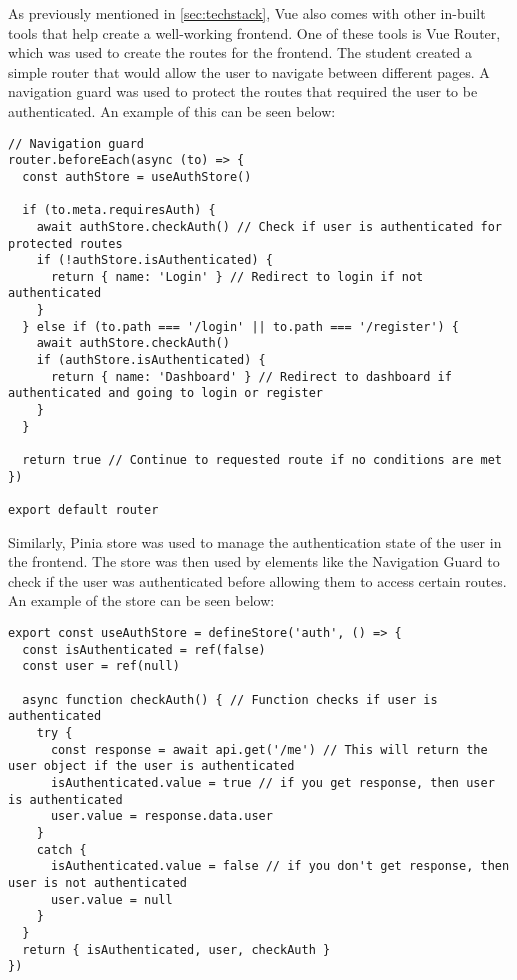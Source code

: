 
As previously mentioned in \ref{sec:techstack}, Vue also comes with other in-built tools that help create a well-working frontend. One of these tools is Vue Router, which was used to create the routes for the frontend. The student created a simple router that would allow the user to navigate between different pages. A navigation guard was used to protect the routes that required the user to be authenticated. An example of this can be seen below:

\begin{lstlisting}[caption=Vue Router Navigation Guard]
    // Navigation guard
router.beforeEach(async (to) => {
  const authStore = useAuthStore()

  if (to.meta.requiresAuth) {
    await authStore.checkAuth() // Check if user is authenticated for protected routes
    if (!authStore.isAuthenticated) {
      return { name: 'Login' } // Redirect to login if not authenticated
    }
  } else if (to.path === '/login' || to.path === '/register') {
    await authStore.checkAuth()
    if (authStore.isAuthenticated) {
      return { name: 'Dashboard' } // Redirect to dashboard if authenticated and going to login or register
    }
  }

  return true // Continue to requested route if no conditions are met
})

export default router
\end{lstlisting}

Similarly, Pinia store was used to manage the authentication state of the user in the frontend. The store was then used by elements like the Navigation Guard to check if the user was authenticated before allowing them to access certain routes. An example of the store can be seen below:

\begin{lstlisting}[caption=Pinia Store for Authentication]
export const useAuthStore = defineStore('auth', () => {
  const isAuthenticated = ref(false)
  const user = ref(null)

  async function checkAuth() { // Function checks if user is authenticated
    try {
      const response = await api.get('/me') // This will return the user object if the user is authenticated
      isAuthenticated.value = true // if you get response, then user is authenticated
      user.value = response.data.user
    }
    catch {
      isAuthenticated.value = false // if you don't get response, then user is not authenticated
      user.value = null
    }
  }
  return { isAuthenticated, user, checkAuth }
})
\end{lstlisting}

